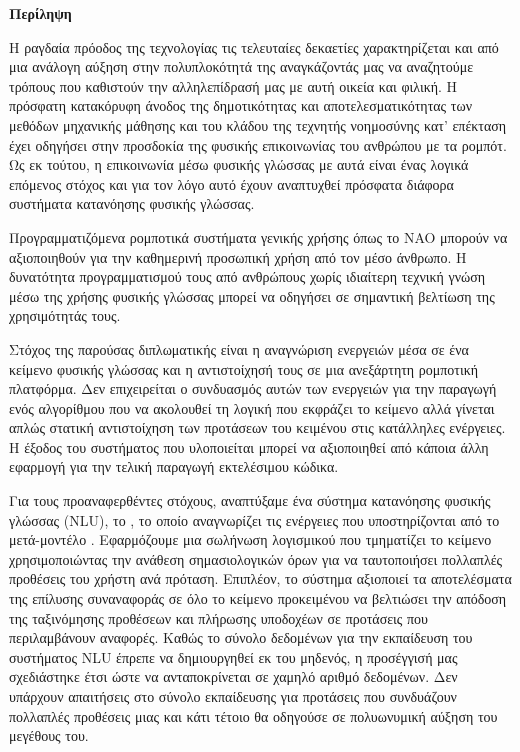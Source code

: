 \begin{center}
    \centering

    \vspace{0.3cm}
    \centering
    \textbf{\Large{Περίληψη}}

    \vspace{0.1cm}
\end{center}

Η ραγδαία πρόοδος της τεχνολογίας τις τελευταίες δεκαετίες χαρακτηρίζεται και από μια ανάλογη αύξηση στην πολυπλοκότητά της αναγκάζοντάς μας να αναζητούμε τρόπους που καθιστούν την αλληλεπίδρασή μας με αυτή οικεία και φιλική.
Η πρόσφατη κατακόρυφη άνοδος της δημοτικότητας και αποτελεσματικότητας των μεθόδων μηχανικής μάθησης
και του κλάδου της τεχνητής νοημοσύνης κατ' επέκταση
έχει οδηγήσει στην προσδοκία της φυσικής επικοινωνίας του ανθρώπου με τα ρομπότ.
Ως εκ τούτου, η επικοινωνία μέσω φυσικής γλώσσας με αυτά είναι ένας λογικά επόμενος στόχος και για τον λόγο αυτό έχουν αναπτυχθεί πρόσφατα διάφορα συστήματα κατανόησης φυσικής γλώσσας.

Προγραμματιζόμενα ρομποτικά συστήματα γενικής χρήσης όπως το NAO μπορούν να αξιοποιηθούν για την καθημερινή προσωπική χρήση από τον μέσο άνθρωπο.
Η δυνατότητα προγραμματισμού τους από ανθρώπους χωρίς ιδιαίτερη τεχνική γνώση μέσω της χρήσης φυσικής γλώσσας μπορεί να οδηγήσει σε σημαντική βελτίωση της χρησιμότητάς τους.

Στόχος της παρούσας διπλωματικής είναι η αναγνώριση ενεργειών μέσα σε ένα κείμενο φυσικής γλώσσας και η αντιστοίχησή τους σε μια ανεξάρτητη ρομποτική πλατφόρμα.
Δεν επιχειρείται ο συνδυασμός αυτών των ενεργειών για την παραγωγή ενός αλγορίθμου που να ακολουθεί τη λογική που εκφράζει το κείμενο
αλλά γίνεται απλώς στατική αντιστοίχηση των προτάσεων του κειμένου στις κατάλληλες ενέργειες.
Η έξοδος του συστήματος που υλοποιείται μπορεί να αξιοποιηθεί από κάποια άλλη εφαρμογή για την τελική παραγωγή εκτελέσιμου κώδικα.

Για τους προαναφερθέντες στόχους, αναπτύξαμε ένα σύστημα κατανόησης φυσικής γλώσσας (NLU), το \projectname{}, το οποίο αναγνωρίζει τις ενέργειες που υποστηρίζονται από το μετά-μοντέλο \metamodel{}.
Εφαρμόζουμε μια σωλήνωση λογισμικού που τμηματίζει το κείμενο χρησιμοποιώντας την ανάθεση σημασιολογικών όρων για να ταυτοποιήσει πολλαπλές προθέσεις του χρήστη ανά πρόταση.
Επιπλέον, το σύστημα αξιοποιεί τα αποτελέσματα της επίλυσης συναναφοράς σε όλο το κείμενο προκειμένου να βελτιώσει την απόδοση της ταξινόμησης προθέσεων και πλήρωσης υποδοχέων σε προτάσεις που περιλαμβάνουν αναφορές.
Καθώς το σύνολο δεδομένων για την εκπαίδευση του συστήματος NLU έπρεπε να δημιουργηθεί εκ του μηδενός, η προσέγγισή μας σχεδιάστηκε έτσι ώστε να ανταποκρίνεται σε χαμηλό αριθμό δεδομένων.
Δεν υπάρχουν απαιτήσεις στο σύνολο εκπαίδευσης για προτάσεις που συνδυάζουν πολλαπλές προθέσεις μιας και κάτι τέτοιο θα οδηγούσε σε πολυωνυμική αύξηση του μεγέθους του.

